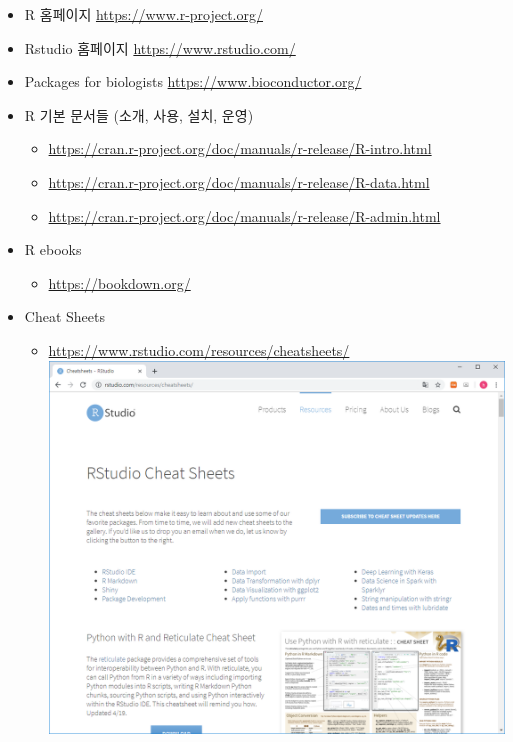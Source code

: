 \documentclass[]{book}
\providecommand{\tightlist}{%
  \setlength{\itemsep}{0pt}\setlength{\parskip}{0pt}}
\begin{document}
\begin{itemize}
\tightlist
\item
  R 홈페이지 \url{https://www.r-project.org/}
\item
  Rstudio 홈페이지 \url{https://www.rstudio.com/}
\item
  Packages for biologists \url{https://www.bioconductor.org/}
\item
  R 기본 문서들 (소개, 사용, 설치, 운영)

  \begin{itemize}
  \tightlist
  \item
    \url{https://cran.r-project.org/doc/manuals/r-release/R-intro.html}
  \item
    \url{https://cran.r-project.org/doc/manuals/r-release/R-data.html}
  \item
    \url{https://cran.r-project.org/doc/manuals/r-release/R-admin.html}
  \end{itemize}
\item
  R ebooks

  \begin{itemize}
  \tightlist
  \item
    \url{https://bookdown.org/}
  \end{itemize}
\item
  Cheat Sheets

  \begin{itemize}
  \tightlist
  \item
    \url{https://www.rstudio.com/resources/cheatsheets/}
    \includegraphics{images/01-16.PNG}
  \end{itemize}
\end{itemize}
\end{document}
